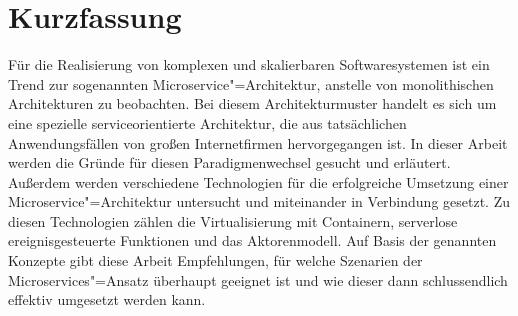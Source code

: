 \chapter{Kurzfassung}

Für die Realisierung von komplexen und skalierbaren Softwaresystemen ist ein Trend zur sogenannten Microservice"=Architektur, anstelle von monolithischen Architekturen zu beobachten. Bei diesem Architekturmuster handelt es sich um eine spezielle serviceorientierte Architektur, die aus tatsächlichen Anwendungsfällen von großen Internetfirmen hervorgegangen ist. In dieser Arbeit werden die Gründe für diesen Paradigmenwechsel gesucht und erläutert. Außerdem werden verschiedene Technologien für die erfolgreiche Umsetzung einer Microservice"=Architektur untersucht und miteinander in Verbindung gesetzt. Zu diesen Technologien zählen die Virtualisierung mit Containern, serverlose ereignisgesteuerte Funktionen und das Aktorenmodell. Auf Basis der genannten Konzepte gibt diese Arbeit Empfehlungen, für welche Szenarien der Microservices"=Ansatz überhaupt geeignet ist und wie dieser dann schlussendlich effektiv umgesetzt werden kann.